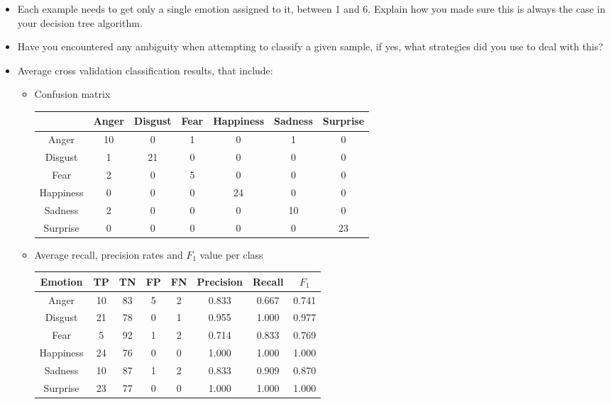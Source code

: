 \documentclass[a4paper]{article}
\begin{document}
\begin{itemize}
  \item Each example needs to get only a single emotion assigned to it, between
    1 and 6. Explain how you made sure this is always the case in your decision
    tree algorithm.

  \item Have you encountered any ambiguity when attempting to classify a given
    sample, if yes, what strategies did you use to deal with this?

  \item Average cross validation classification results, that include:
    \begin{itemize}
      \item Confusion matrix

        \begin{tabular}{c|cccccc}
          & Anger & Disgust & Fear & Happiness & Sadness & Surprise \\
          \hline
          Anger & 10 & 0 & 1 & 0 & 1 & 0 \\
        Disgust & 1 & 21 & 0 & 0 & 0 & 0 \\
           Fear & 2 & 0 & 5 & 0 & 0 & 0 \\
      Happiness & 0 & 0 & 0 & 24 & 0 & 0 \\
        Sadness & 2 & 0 & 0 & 0 & 10 & 0 \\
       Surprise & 0 & 0 & 0 & 0 & 0 & 23 \\
        \end{tabular}

      \item Average recall, precision rates and $F_1$ value per class

        \begin{tabular}{c|cccc|ccc}
          Emotion & TP & TN & FP & FN & Precision & Recall & $F_1$ \\
          \hline
          Anger & 10 & 83 & 5 & 2 & 0.833 & 0.667 & 0.741 \\
          Disgust & 21 & 78 & 0 & 1 & 0.955 & 1.000 & 0.977 \\
          Fear & 5 & 92 & 1 & 2 & 0.714 & 0.833 & 0.769 \\
          Happiness & 24 & 76 & 0 & 0 & 1.000 & 1.000 & 1.000 \\
          Sadness & 10 & 87 & 1 & 2 & 0.833 & 0.909 & 0.870 \\
          Surprise & 23 & 77 & 0 & 0 & 1.000 & 1.000 & 1.000 \\
        \end{tabular}
      \end{itemize}


\end{itemize}
\end{document}
